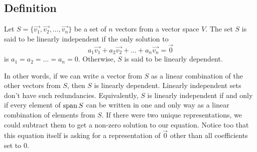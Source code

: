 \subsection{Definition}

\begin{definition}
	Let $S = \{\vec{v_1}, \vec{v_2}, \dots, \vec{v_n}\}$ be a set of $n$ vectors from a vector space $V$. 
	The set $S$ is said to be linearly independent if the only solution to
	\begin{equation*}
		a_1\vec{v_1} + a_2\vec{v_2} + \dots + a_n\vec{v_n} = \vec{0}
	\end{equation*}
	is $a_1 = a_2 = \dots = a_n = 0$.
	Otherwise, $S$ is said to be linearly dependent.
\end{definition}

In other words, if we can write a vector from $S$ as a linear combination of the other vectors from $S$, then $S$ is linearly dependent.
Linearly independent sets don't have such redundancies.
Equivalently, $S$ is linearly independent if and only if every element of $\operatorname{span}{S}$ can be written in one and only way as a linear combination of elements from $S$.
If there were two unique representations, we could subtract them to get a non-zero solution to our equation.
Notice too that this equation itself is asking for a representation of $\vec{0}$ other than all coefficients set to 0.

